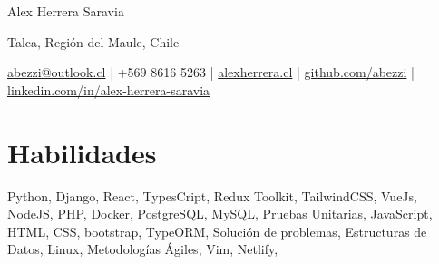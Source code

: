 \documentclass[11pt]{article}       %
\begin{document}
\centerline{\Huge Alex Herrera Saravia}

\vspace{5pt}

\centerline{Talca, Regi\'on del Maule, Chile}
\centerline{\href{mailto:abezzi@outlook.cl}{abezzi@outlook.cl} | +569 8616 5263 | \href{https://alexherrera.cl}{alexherrera.cl} | \href{https://github.com/Abezzi}{github.com/abezzi} | \href{https://linkedin.com/in/alex-herrera-saravia/}{linkedin.com/in/alex-herrera-saravia}}

\vspace{-10pt}

\section*{Habilidades}
Python, Django, React, TypesCript, Redux Toolkit, TailwindCSS, VueJs, NodeJS, PHP, Docker, PostgreSQL, MySQL, Pruebas Unitarias, JavaScript, HTML, CSS, bootstrap, TypeORM, Soluci\'on de problemas, Estructuras de Datos, Linux, Metodolog\'ias \'Agiles, Vim, Netlify,  \\

\vspace{-6.5pt}

\end{document}
